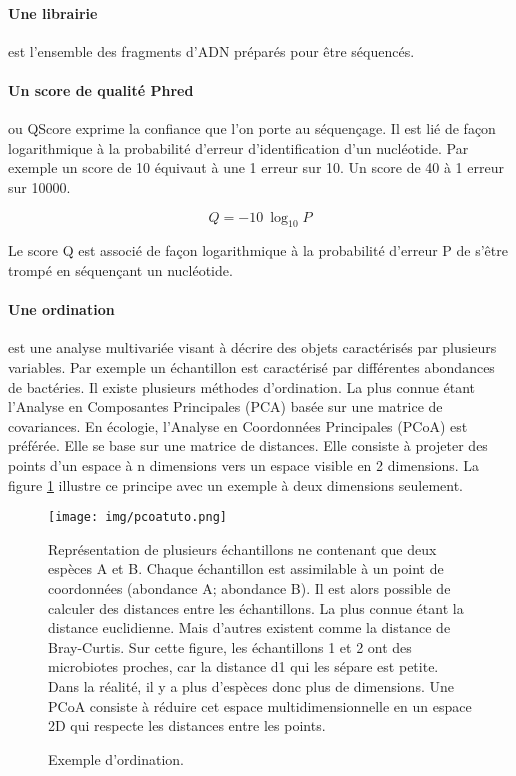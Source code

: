 \documentclass[12pt,a4paper]{article}
\begin{document}
\paragraph{Une librairie} est l'ensemble des fragments d'ADN préparés pour être séquencés.

\paragraph{Un score de qualité Phred} ou QScore exprime la confiance que l'on porte au séquençage. Il est lié de façon logarithmique à la probabilité d'erreur d'identification d'un nucléotide.  Par exemple un score de 10 équivaut à une 1 erreur sur 10. Un score de 40 à 1 erreur sur 10000.


\begin{mycapequ}[!h]
   \begin{equation}
    Q = -10 \ \log_{10} P
   \end{equation}
      \caption{Le score Q est associé de façon logarithmique à la probabilité d'erreur P de s'être trompé en séquençant un nucléotide.}
\end{mycapequ}




\paragraph{Une ordination} est une analyse multivariée visant à décrire des objets caractérisés par plusieurs variables. Par exemple un échantillon est caractérisé par différentes abondances de bactéries. Il existe plusieurs méthodes d'ordination. La plus connue étant l'Analyse en Composantes Principales (PCA) basée sur une matrice de covariances. En écologie, l'Analyse en Coordonnées Principales (PCoA) est préférée. Elle se base sur une matrice de distances. Elle consiste à projeter des points d'un espace à n dimensions vers un espace visible en 2 dimensions.
La figure \ref{pcoatuto} illustre ce principe avec un exemple à deux dimensions seulement.

\begin{figure}[!h]
\begin{center}
\texttt{[image: img/pcoatuto.png]}\hfill
\end{center}
\caption{Exemple d'ordination.}
Représentation de plusieurs échantillons ne contenant que deux espèces A et B. Chaque échantillon est assimilable à un point de coordonnées (abondance A; abondance B). Il est alors possible de calculer des distances entre les échantillons. La plus connue étant la distance euclidienne. Mais d'autres existent comme la distance de Bray-Curtis. Sur cette figure, les échantillons 1 et 2 ont des microbiotes proches, car la distance d1 qui les sépare est petite. Dans la réalité, il y a plus d'espèces donc plus de dimensions. Une PCoA consiste à réduire cet espace multidimensionnelle en un espace 2D qui respecte les distances entre les points.
\label{pcoatuto}
\end{figure}
\newpage
\end{document}

